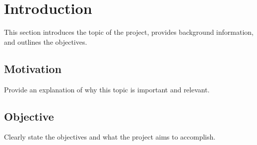 

\section{Introduction}

    This section introduces the topic of the project, provides background information, and outlines the objectives.

    \subsection{Motivation}

        Provide an explanation of why this topic is important and relevant.

    \subsection{Objective}

        Clearly state the objectives and what the project aims to accomplish.
